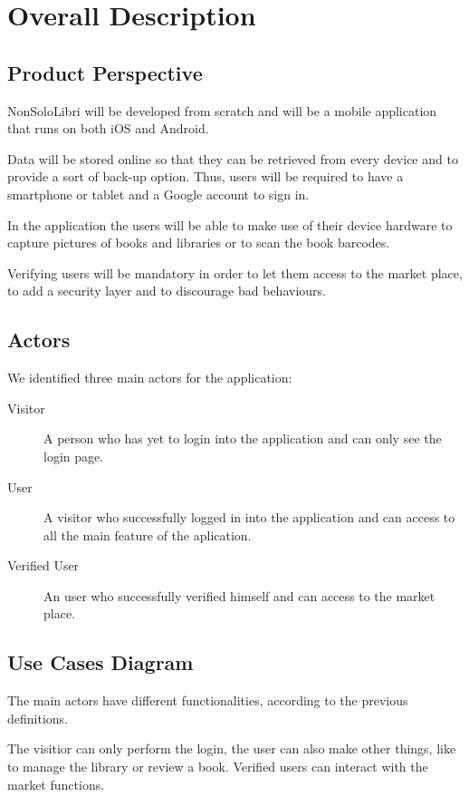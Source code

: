 \chapter{Overall Description}

\section{Product Perspective}
NonSoloLibri will be developed from scratch and will be a mobile application that runs on
both iOS and Android. 

Data will be stored online so that they can be retrieved from every device and to provide a sort of back-up option.
Thus, users will be required to have a smartphone or tablet and a Google account to sign in.

In the application the users will be able to make use of their device hardware to capture pictures of books and libraries or to scan the book barcodes.

Verifying users will be mandatory in order to let them access to the market place, to add a security layer and to discourage bad behaviours.

\section{Actors}

We identified three main actors for the application:

\begin{description}
    \item[Visitor] A person who has yet to login into the application and can only see the login page.
    \item[User] A visitor who successfully logged in into the application and can access to all the main feature of the aplication.
    \item[Verified User] An user who successfully verified himself and can access to the market place.
\end{description} 

\newpage

\section{Use Cases Diagram}
The main actors have different functionalities, according to the previous definitions.

The visitior can only perform the login, the user can also make other things, like to manage the library or review a book.
Verified users can interact with the market functions.

